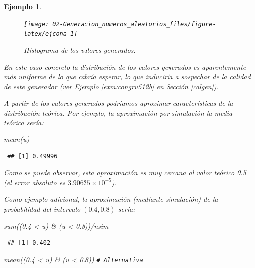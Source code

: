 \documentclass[
  10pt,
]{book}
\newenvironment{Shaded}{\begin{snugshade}}{\end{snugshade}}
\newcommand{\CommentTok}[1]{\textcolor[rgb]{0.56,0.35,0.01}{\textit{#1}}}
\newcommand{\FloatTok}[1]{\textcolor[rgb]{0.00,0.00,0.81}{#1}}
\newcommand{\FunctionTok}[1]{\textcolor[rgb]{0.00,0.00,0.00}{#1}}
\newcommand{\NormalTok}[1]{#1}
\newcommand{\SpecialCharTok}[1]{\textcolor[rgb]{0.00,0.00,0.00}{#1}}
\theoremstyle{break}
\newtheorem{example}{Ejemplo}[chapter]
\theoremstyle{nonumberplain}
\renewcommand{\CommentTok}[1]{\textcolor[rgb]{0.41,0.41,0.41}{\texttt{#1}}}
\begin{document}
\begin{example}
\begin{figure}[!htbp]

{\centering \texttt{[image: 02-Generacion\_numeros\_aleatorios\_files/figure-latex/ejcona-1]} 

}

\caption{Histograma de los valores generados.}\label{fig:ejcona}
\end{figure}

En este caso concreto la distribución de los valores generados es aparentemente más uniforme de lo que cabría esperar, lo que induciría a sospechar de la calidad de este generador (ver Ejemplo \ref{exm:congru512b} en Sección \ref{calgen}).

A partir de los valores generados podríamos aproximar características de la distribución teórica.
Por ejemplo, la aproximación por simulación la media teórica sería:

\begin{Shaded}
\begin{Highlighting}[]
\FunctionTok{mean}\NormalTok{(u)}
\end{Highlighting}
\end{Shaded}

\begin{verbatim}
 ## [1] 0.49996
\end{verbatim}

Como se puede observar, esta aproximación es muy cercana al valor teórico 0.5 (el error absoluto es \(\ensuremath{3.90625\times 10^{-5}}\)).

Como ejemplo adicional, la aproximación (mediante simulación) de la probabilidad del intervalo \((0.4, 0.8)\) sería:

\begin{Shaded}
\begin{Highlighting}[]
\FunctionTok{sum}\NormalTok{((}\FloatTok{0.4} \SpecialCharTok{\textless{}}\NormalTok{ u) }\SpecialCharTok{\&}\NormalTok{ (u }\SpecialCharTok{\textless{}} \FloatTok{0.8}\NormalTok{))}\SpecialCharTok{/}\NormalTok{nsim}
\end{Highlighting}
\end{Shaded}

\begin{verbatim}
 ## [1] 0.402
\end{verbatim}

\begin{Shaded}
\begin{Highlighting}[]
\FunctionTok{mean}\NormalTok{((}\FloatTok{0.4} \SpecialCharTok{\textless{}}\NormalTok{ u) }\SpecialCharTok{\&}\NormalTok{ (u }\SpecialCharTok{\textless{}} \FloatTok{0.8}\NormalTok{))     }\CommentTok{\# Alternativa}
\end{Highlighting}
\end{Shaded}


\end{example}
\end{document}
